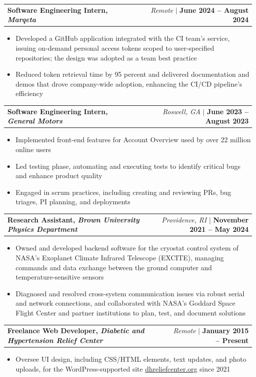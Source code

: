 \documentclass[letterpaper,10.9pt]{article}
\makeatletter
\newcommand{\resumeItem}[1]{
  \item\small{
    {#1 \vspace{-2pt}}
  }
}
\newcommand{\resumeSubheading}[4]{
  \item
  \begin{tabular*}{\textwidth}{l@{\extracolsep{\fill}}r}
    \textbf{#1, \small \emph{#3}} & \small{\emph{#4}} $|$ \small{\textbf{#2}} \\
  \end{tabular*}\vspace{-7pt}
}
\newcommand{\resumeItemListStart}{\begin{itemize}}
\newcommand{\resumeItemListEnd}{\end{itemize}\vspace{-5pt}}
\makeatother
\begin{document}
\resumeSubheading
  {Software Engineering Intern}{June 2024 -- August 2024}
  {Marqeta}{Remote}
  \resumeItemListStart
    \resumeItem{Developed a GitHub application integrated with the CI team's service, issuing on-demand personal access tokens scoped to user-specified repositories; the design was adopted as a team best practice}
    \resumeItem{Reduced token retrieval time by 95 percent and delivered documentation and demos that drove company-wide adoption, enhancing the CI/CD pipeline's efficiency}
  \resumeItemListEnd


\resumeSubheading
  {Software Engineering Intern}{June 2023 -- August 2023}
  {General Motors}{Roswell, GA}
  \resumeItemListStart
    \resumeItem{Implemented front-end features for Account Overview used by over 22 million online users}
    \resumeItem{Led testing phase, automating and executing tests to identify critical bugs and enhance product quality}
    \resumeItem{Engaged in scrum practices, including creating and reviewing PRs, bug triages, PI planning, and deployments}
  \resumeItemListEnd

\resumeSubheading
  {Research Assistant}{November 2021 -- May 2024}
  {Brown University Physics Department}{Providence, RI}
  \resumeItemListStart
    \resumeItem{Owned and developed backend software for the cryostat control system of NASA's Exoplanet Climate Infrared Telescope (EXCITE), managing commands and data exchange between the ground computer and temperature-sensitive sensors}
    \resumeItem{Diagnosed and resolved cross-system communication issues via robust serial and network connections, and collaborated with NASA's Goddard Space Flight Center and partner institutions to plan, test, and document solutions}
  \resumeItemListEnd

\resumeSubheading
  {Freelance Web Developer}{January 2015 -- Present}
  {Diabetic and Hypertension Relief Center}{Remote}
  \resumeItemListStart
    \resumeItem{Oversee UI design, including CSS/HTML elements, text updates, and photo uploads, for the WordPress-supported site \href{http://www.dhreliefcenter.org/}{dhreliefcenter.org} since 2021}
  \resumeItemListEnd
\end{document}
